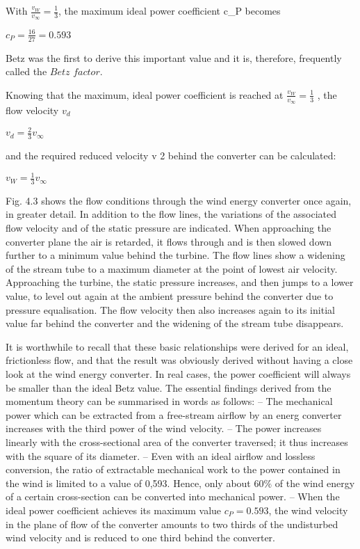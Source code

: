 With $\frac{v_W}{v_{\infty}} = \frac{1}{3}$, the maximum ideal power coefficient c_P becomes

$c_P = \frac{16}{27} = 0.593$

Betz was the first to derive this important value and it is, therefore, frequently called the $Betz$ $factor$.

Knowing that the maximum, ideal power coefficient is reached at $\frac{v_W}{v_{\infty}} = \frac{1}{3}$ , the flow velocity $v_d$

$v_d = \frac{2}{3} v_{\infty}$

and the required reduced velocity v 2 behind the converter can be calculated:

$v_W = \frac{1}{3} v_{\infty}$

Fig. 4.3 shows the flow conditions through the wind energy converter once again, in greater detail. In addition to the flow lines, the variations of the associated flow velocity and of the static pressure are indicated. When approaching the converter plane the air is retarded, it flows through and is then slowed down further to a minimum value behind the turbine. The flow lines show a widening of the stream tube to a maximum diameter at the point of lowest air velocity. Approaching the turbine, the static pressure increases, and then jumps to a lower value, to level out again at the ambient pressure behind the converter due to pressure equalisation. The flow velocity then also increases again to its initial value far behind the converter and the widening of the stream tube disappears.

It is worthwhile to recall that these basic relationships were derived for an ideal, frictionless flow, and that the result was obviously derived without having a close look at the wind energy converter. In real cases, the power coefficient will always be smaller than the ideal Betz value. The essential findings derived from the momentum theory can be summarised in words as follows:
– The mechanical power which can be extracted from a free-stream airflow by an energ converter increases with the third power of the wind velocity.
– The power increases linearly with the cross-sectional area of the converter traversed; it thus increases with the square of its diameter.
– Even with an ideal airflow and lossless conversion, the ratio of extractable mechanical work to the power contained in the wind is limited to a value of 0,593. Hence, only about $60\%$ of the wind energy of a certain cross-section can be converted into mechanical power.
– When the ideal power coefficient achieves its maximum value $c_P = 0.593$, the wind velocity in the plane of flow of the converter amounts to two thirds of the undisturbed wind velocity and is reduced to one third behind the converter.

